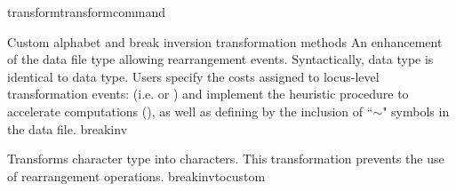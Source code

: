 \begin{command}{transform}{transformcommand}
\begin{arguments}
\begin{argumentgroup}{Custom alphabet and break inversion transformation methods}
                {An enhancement \\ of the data file type  allowing
           	 rearrangement events. Syntactically,  data type is identical to 
            	 data type. Users specify 
                the costs assigned to locus-level transformation events: (i.e. 
                 or  ) 
                and implement the heuristic  procedure to accelerate computations 
                (), as well as defining  by the 
                inclusion of ``$\sim$" symbols in the data file.} 
                {breakinv}
                
                {Transforms  character type into  characters.
                This transformation prevents the use of rearrangement operations.}
                 {breakinvtocustom}

                
        \end{argumentgroup}
       

\end{arguments}
\end{command}
